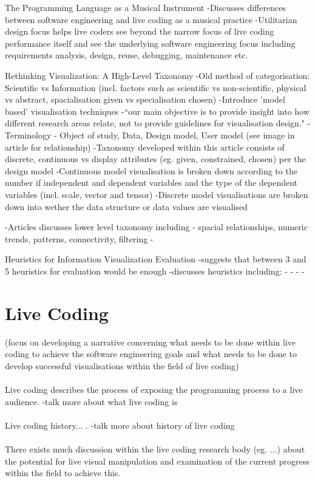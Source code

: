The Programming Language as a Musical Instrument
-Discusses differences between software engineering and live coding as a musical practice
-Utilitarian design focus helps live coders see beyond the narrow focus of live coding performance itself and see the underlying software engineering focus including requirements analysis, design, reuse, debugging, maintenance etc.

Rethinking Visualization: A High-Level Taxonomy
-Old method of categorisation: Scientific vs Information (incl. factors such as scientific vs non-scientific, physical vs abstract, spacialisation given vs specialisation chosen)
-Introduce 'model based' visualisation techniques
-“our main objective is to provide insight into how different research areas relate, not to provide guidelines for visualisation design."
-Terminology - Object of study, Data, Design model, User model (see image in article for relationship)
-Taxonomy developed within this article consists of {discrete, continuous} vs display attributes (eg. given, constrained, chosen) per the design model
-Continuous model visualisation is broken down according to the number if independent and dependent variables and the type of the dependent variables (incl. scale, vector and tensor)
-Discrete model visualisations are broken down into wether the data structure or data values are visualised

-Articles discusses lower level taxonomy including - spacial relationships, numeric trends, patterns, connectivity, filtering
-

Heuristics for Information Visualization Evaluation
-suggests that between 3 and 5 heuristics for evaluation would be enough
-discusses heuristics including:
	-
	-
	-
	-

\section{Live Coding}
\label{sec:livecoding}

(focus on developing a narrative concerning what needs to be done within live coding to achieve the software engineering goals and what needs to be done to develop successful visualisations within the field of live coding)
\\\\
Live coding describes the process of exposing the programming process to a live audience. -talk more about what live coding is
\\\\
Live coding history... . -talk more about history of live coding
\\\\
There exists much discussion within the live coding research body (eg. ...) about the potential for live visual manipulation and examination of the current progress within the field to achieve this.


